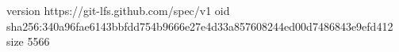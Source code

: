 version https://git-lfs.github.com/spec/v1
oid sha256:340a96fae6143bbfdd754b9666e27e4d33a857608244ed00d7486843e9efd412
size 5566
